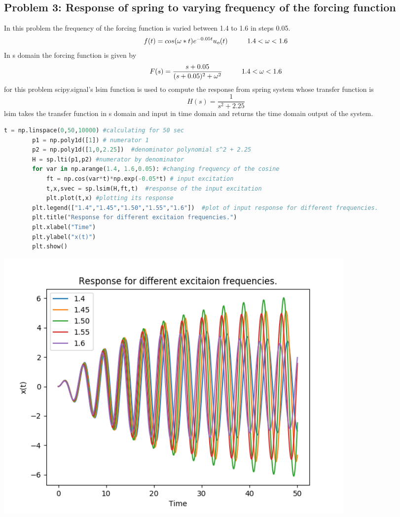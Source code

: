 \documentclass[a4paper]{article}
\begin{document}
\subsection{Problem 3: Response of spring to varying frequency of the forcing function}
In this problem the frequency of the forcing function is varied between 1.4 to 1.6  in steps 0.05.
$$ f(t) = cos(\omega*t)e^{-0.05t}u_{o}(t) \hspace{10mm}	1.4 < \omega < 1.6$$
In s domain the forcing function is given by
$$ F(s) = \frac{s + 0.05}{(s + 0.05)^{2} + \omega^{2}}   \hspace{10mm}	1.4 < \omega < 1.6 $$
for this problem scipy.signal's lsim function is used to compute the response from spring system whose transfer function is 
$$ H(s) = \frac{1}{s^{2} + 2.25}$$
lsim takes the transfer function in s domain and input in time domain and returns the time domain output of the system.
\begin{lstlisting}[language=Python]
t = np.linspace(0,50,10000) #calculating for 50 sec
		p1 = np.poly1d([1]) # numerator 1
		p2 = np.poly1d([1,0,2.25])	#denominator polynomial s^2 + 2.25
		H = sp.lti(p1,p2) #numerator by denominator
		for var in np.arange(1.4, 1.6,0.05): #changing frequency of the cosine
			ft = np.cos(var*t)*np.exp(-0.05*t) # input excitation
			t,x,svec = sp.lsim(H,ft,t)  #response of the input excitation
			plt.plot(t,x) #plotting its response
		plt.legend(["1.4","1.45","1.50","1.55","1.6"])	#plot of input response for different frequencies.
		plt.title("Response for different excitaion frequencies.")
		plt.xlabel("Time")
		plt.ylabel("x(t)")	
		plt.show()
\end{lstlisting}
\begin{center}
\includegraphics[width=0.8\textwidth]{Figure_3.png}
\end{center}
\end{document}
